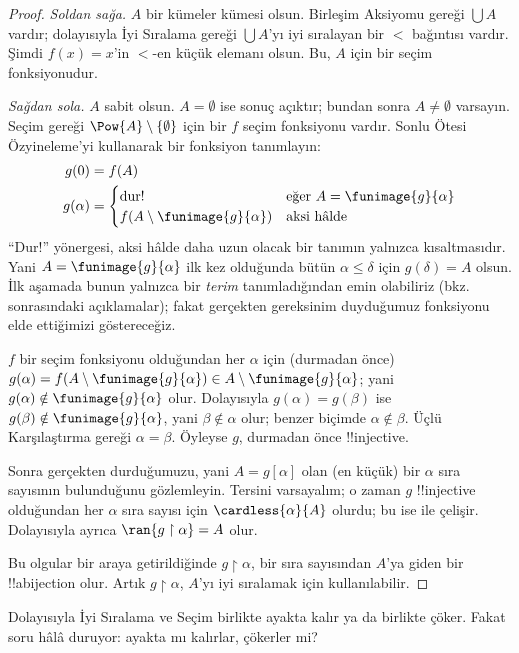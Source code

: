 \begin{proof}
\emph{Soldan sağa.} $A$ bir kümeler kümesi olsun. Birleşim Aksiyomu
gereği $\bigcup A$ vardır; dolayısıyla İyi Sıralama gereği
$\bigcup A$'yı iyi sıralayan bir $<$ bağıntısı vardır. Şimdi
$f(x)=\text{$x$'in $<$-en küçük elemanı}$ olsun. Bu, $A$ için bir seçim
fonksiyonudur.

\emph{Sağdan sola.} $A$ sabit olsun. $A=\emptyset$ ise sonuç açıktır;
bundan sonra $A\neq\emptyset$ varsayın. Seçim gereği
$\Pow{A}\setminus\{\emptyset\}$ için bir $f$ seçim fonksiyonu vardır.
Sonlu Ötesi Özyineleme'yi kullanarak bir fonksiyon tanımlayın:
\begin{align*}
	g(0) &= f(A)\\
	g(\alpha) &=
		\begin{cases}
			\text{dur!{}} &\text{eğer }A = \funimage{g}{\alpha}\\
			f(A \setminus \funimage{g}{\alpha}) & \text{aksi hâlde}\\	
		\end{cases}
\end{align*}
``Dur!'' yönergesi, aksi hâlde daha uzun olacak bir tanımın yalnızca
kısaltmasıdır. Yani $A=\funimage{g}{\alpha}$ ilk kez olduğunda bütün
$\alpha\leq\delta$ için $g(\delta)=A$ olsun. İlk aşamada bunun yalnızca
bir \emph{terim} tanımladığından emin olabiliriz (bkz.
 sonrasındaki
açıklamalar); fakat gerçekten gereksinim duyduğumuz fonksiyonu elde
ettiğimizi göstereceğiz.

$f$ bir seçim fonksiyonu olduğundan her $\alpha$ için (durmadan önce)
$g(\alpha)=f(A\setminus\funimage{g}{\alpha})\in
A\setminus\funimage{g}{\alpha}$; yani
$g(\alpha)\notin\funimage{g}{\alpha}$ olur. Dolayısıyla
$g(\alpha)=g(\beta)$ ise
$g(\beta)\notin\funimage{g}{\alpha}$, yani $\beta\notin\alpha$ olur;
benzer biçimde $\alpha\notin\beta$. Üçlü Karşılaştırma gereği
$\alpha=\beta$. Öyleyse $g$, durmadan önce !!{injective}.

Sonra gerçekten durduğumuzu, yani $A=g[\alpha]$ olan (en küçük) bir
$\alpha$ sıra sayısının bulunduğunu gözlemleyin. Tersini varsayalım;
o zaman $g$ !!{injective} olduğundan her $\alpha$ sıra sayısı için
$\cardless{\alpha}{A}$ olurdu; bu ise  ile
çelişir. Dolayısıyla ayrıca $\ran{g\restriction\alpha}=A$ olur.

Bu olgular bir araya getirildiğinde $g\restriction\alpha$, bir sıra
sayısından $A$'ya giden bir !!a{bijection} olur. Artık
$g\restriction\alpha$, $A$'yı iyi sıralamak için kullanılabilir.
\end{proof}

Dolayısıyla İyi Sıralama ve Seçim birlikte ayakta kalır ya da birlikte
çöker. Fakat soru hâlâ duruyor: ayakta mı kalırlar, çökerler mi?

